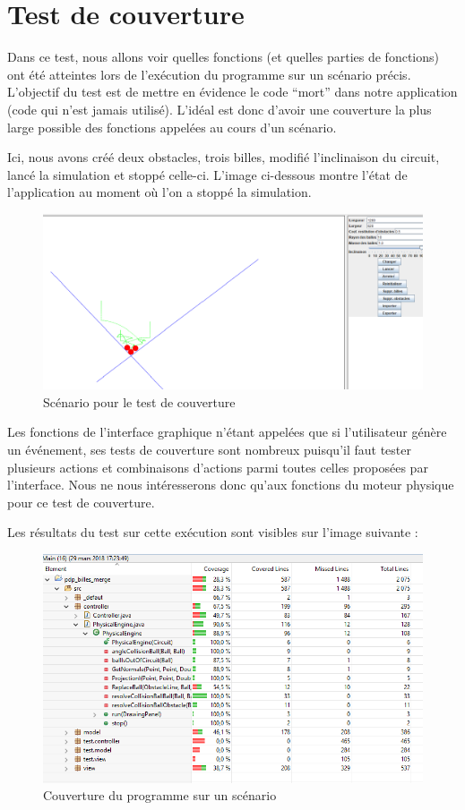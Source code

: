 \documentclass{report}
\begin{document}
\newpage
\section{Test de couverture}

Dans ce test, nous allons voir quelles fonctions (et quelles parties de fonctions) ont été atteintes lors de l’exécution du programme sur un scénario précis. L’objectif du test est de mettre en évidence le code “mort” dans notre application (code qui n’est jamais utilisé). L’idéal est donc d’avoir une couverture la plus large possible des fonctions appelées au cours d’un scénario.

Ici, nous avons créé deux obstacles, trois billes, modifié l’inclinaison du circuit, lancé la simulation et stoppé celle-ci. L’image ci-dessous montre l’état de l’application au moment où l’on a stoppé la simulation.


\begin{figure}[H]
\centering
\includegraphics[scale=0.8]{cas_cov.png}
\caption{Scénario pour le test de couverture}
\end{figure}

Les fonctions de l’interface graphique n’étant appelées que si l’utilisateur génère un événement, ses tests de couverture sont nombreux puisqu’il faut tester plusieurs actions et combinaisons d’actions parmi toutes celles proposées par l’interface. 
Nous ne nous intéresserons donc qu’aux fonctions du moteur physique pour ce test de couverture.

\newpage
Les résultats du test sur cette exécution sont visibles sur l’image suivante :

\begin{figure}[H]
\centering
\includegraphics[scale=0.8]{coverage.png}
\caption{Couverture du programme sur un scénario}
\end{figure}
\end{document}
